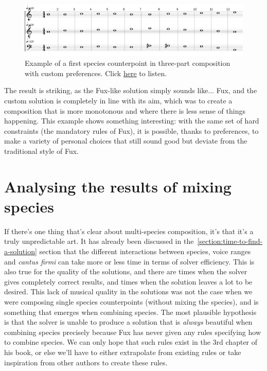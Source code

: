 \begin{figure}[h!]
    \centering
    \includegraphics[width=1\textwidth]{Images/Musicality/musicality-1sp-custom-pref.png}
    \caption{Example of a first species counterpoint in three-part composition with custom preferences. Click \href{https://youtu.be/aWmkHdcuook}{here} to listen.}
    \label{fig:musicality-1sp-custom}
\end{figure}

The result is striking, as the Fux-like solution simply sounds like... Fux, and the custom solution is completely in line with its aim, which was to create a composition that is more monotonous and where there is less sense of things happening. This example shows something interesting: with the same set of hard constraints (the mandatory rules of Fux), it is possible, thanks to preferences, to make a variety of personal choices that still sound good but deviate from the traditional style of Fux. 

\section{Analysing the results of mixing species}
If there's one thing that's clear about multi-species composition, it's that it's a truly unpredictable art. It has already been discussed in the~\ref{section:time-to-find-a-solution} section that the different interactions between species, voice ranges and \textit{cantus firmi} can take more or less time in terms of solver efficiency. This is also true for the quality of the solutions, and there are times when the solver gives completely correct results, and times when the solution leaves a lot to be desired. This lack of musical quality in the solutions was not the case when we were composing single species counterpoints (without mixing the species), and is something that emerges when combining species. The most plausible hypothesis is that the solver is unable to produce a solution that is \textit{always} beautiful when combining species precisely because Fux has never given any rules specifying how to combine species. We can only hope that such rules exist in the 3rd chapter of his book, or else we'll have to either extrapolate from existing rules or take inspiration from other authors to create these rules.

